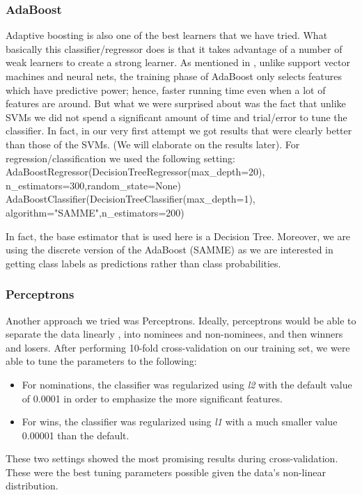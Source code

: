 \documentclass[journal,transmag]{IEEEtran}
\begin{document}
	\subsubsection{AdaBoost}
			\label{adaboost}
			Adaptive boosting is also one of the best learners that we have tried. What basically this classifier/regressor does is that it takes advantage of a number of weak learners to create a strong learner. As mentioned in \cite{adaboost}, unlike support vector machines and neural nets, the training phase of AdaBoost only selects features which have predictive power; hence, faster running time even when a lot of features are around. But what we were surprised about was the fact that unlike SVMs we did not spend a significant amount of time and trial/error to tune the classifier. In fact, in our very first attempt we got results that were clearly better than those of the SVMs. (We will elaborate on the results later). For regression/classification we used the following setting:\\
AdaBoostRegressor(DecisionTreeRegressor(max\_depth=20),\\
n\_estimators=300,random\_state=None)\\
AdaBoostClassifier(DecisionTreeClassifier(max\_depth=1),\\
algorithm="SAMME",n\_estimators=200)

In fact, the base estimator that is used here is a Decision Tree. Moreover, we are using the discrete version of the AdaBoost (SAMME) as we are interested in getting class labels as predictions rather than class probabilities.
			
			\subsubsection{Perceptrons}
			Another approach we tried was Perceptrons. Ideally, perceptrons would be able to separate the data linearly \cite{perceptron}, into nominees and non-nominees, and then winners and losers. After performing 10-fold cross-validation on our training set, we were able to tune the parameters to the following:
			\begin{itemize}
				\item For nominations, the classifier was regularized using \emph{l2} with the default value of 0.0001 in order to emphasize the more significant features.
				\item For wins, the classifier was regularized using \emph{l1} with a much smaller value 0.00001 than the default.
			\end{itemize}
			These two settings showed the most promising results during cross-validation.
			These were the best tuning parameters possible given the data's non-linear distribution.
			
\end{document}

